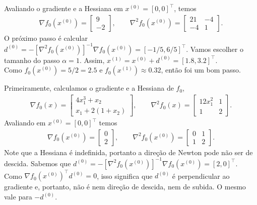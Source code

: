 \begin{questions}
\begin{solution}
    Avaliando o gradiente e a Hessiana em $x^{(0)}=[0,0]^\top$, temos
        \begin{align*}
    \nabla f_0(x^{(0)}) = 
        \begin{bmatrix}
    		9 \\
            -2
		\end{bmatrix},\qquad
    \nabla^2 f_0(x^{(0)}) = 
        \begin{bmatrix}
    		21	 & -4 \\
            -4   &	1
		\end{bmatrix}.
    \end{align*}
    O próximo passo é calcular $d^{(0)}=-[\nabla^2 f_0(x^{(0)})]^{-1} \nabla f_0(x^{(0)}) = [-1/5, 6/5]^\top$. Vamos escolher o tamanho do passo $\alpha=1$. Assim,
    $x^{(1)} = x^{(0)} + d^{(0)} = [1.8, 3.2]^\top.$ \\
    Como $f_0(x^{(0)}) = 5/2 = 2.5$ e $f_0(x^{(1)}) \approx 0.32$, então foi um bom passo.
\end{solution}

\begin{solution}
	Primeiramente, calculamos o gradiente e a Hessiana de $f_0$,
    \begin{align*}
    \nabla f_0(x) = 
        \begin{bmatrix}
    		4 x_1^3 + x_2 \\
            x_1 + 2(1+x_2)
		\end{bmatrix},\qquad
    \nabla^2 f_0(x) = 
        \begin{bmatrix}
    		12 x_1^2 & 1 \\
            1 		 & 2
		\end{bmatrix}.
    \end{align*}
    Avaliando em $x^{(0)} = [0,0]^\top$ temos
    \begin{align*}
    \nabla f_0(x^{(0)}) = 
        \begin{bmatrix}
    		0 \\
            2
		\end{bmatrix},\qquad
    \nabla^2 f_0(x^{(0)}) = 
        \begin{bmatrix}
    		0 & 1 \\
            1 & 2
		\end{bmatrix}.
    \end{align*}
    Note que a Hessiana é indefinida, portanto a direção de Newton pode não ser de descida.
    Sabemos que $d^{(0)}=-[\nabla^2 f_0(x^{(0)})]^{-1} \nabla f_0(x^{(0)}) = [2, 0]^\top$.\\
    Como ${\nabla f_0(x^{(0)})^\top d^{(0)} = 0}$, isso significa que $d^{(0)}$ é perpendicular ao gradiente e, portanto, não é nem direção de descida, nem de subida. O mesmo vale para $-d^{(0)}$.
\end{solution}


\end{questions}
